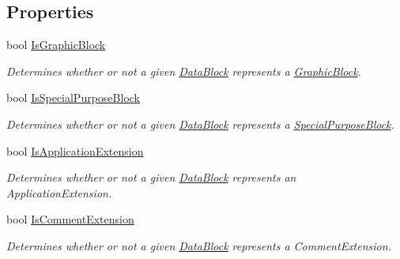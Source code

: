 \subsection*{Properties}
\begin{DoxyCompactItemize}
\item 
bool \hyperlink{classvcvj_1_1_models_1_1_grammatical___components_1_1_data_block_a18ed19c8e02d40cc2551f3d9dc829505}{Is\+Graphic\+Block}
\begin{DoxyCompactList}\small\item\em Determines whether or not a given \hyperlink{classvcvj_1_1_models_1_1_grammatical___components_1_1_data_block}{Data\+Block} represents a \hyperlink{classvcvj_1_1_models_1_1_grammatical___components_1_1_graphic_block}{Graphic\+Block}. \end{DoxyCompactList}\item 
bool \hyperlink{classvcvj_1_1_models_1_1_grammatical___components_1_1_data_block_a734766451ecfc504f507459fffb500a8}{Is\+Special\+Purpose\+Block}
\begin{DoxyCompactList}\small\item\em Determines whether or not a given \hyperlink{classvcvj_1_1_models_1_1_grammatical___components_1_1_data_block}{Data\+Block} represents a \hyperlink{classvcvj_1_1_models_1_1_grammatical___components_1_1_special_purpose_block}{Special\+Purpose\+Block}. \end{DoxyCompactList}\item 
bool \hyperlink{classvcvj_1_1_models_1_1_grammatical___components_1_1_data_block_a9bb735c2e7aa8254611cd6f0dd5af1f0}{Is\+Application\+Extension}
\begin{DoxyCompactList}\small\item\em Determines whether or not a given \hyperlink{classvcvj_1_1_models_1_1_grammatical___components_1_1_data_block}{Data\+Block} represents an Application\+Extension. \end{DoxyCompactList}\item 
bool \hyperlink{classvcvj_1_1_models_1_1_grammatical___components_1_1_data_block_ad690c1a03593faeda687f872b4fa1752}{Is\+Comment\+Extension}
\begin{DoxyCompactList}\small\item\em Determines whether or not a given \hyperlink{classvcvj_1_1_models_1_1_grammatical___components_1_1_data_block}{Data\+Block} represents a Comment\+Extension. \end{DoxyCompactList}\item 

\end{DoxyCompactItemize}
